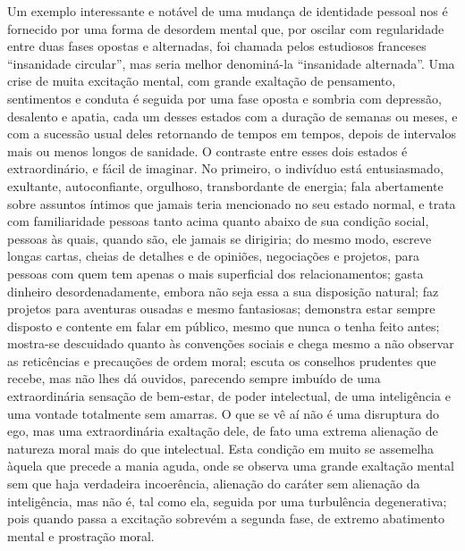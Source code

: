 Um exemplo interessante e notável de uma mudança de identidade pessoal
nos é fornecido por uma forma de desordem mental que, por oscilar com
regularidade entre duas fases opostas e alternadas, foi chamada pelos
estudiosos franceses “insanidade circular”, mas seria melhor
denominá-la “insanidade alternada”.  Uma crise de muita excitação
mental, com grande exaltação de pensamento, sentimentos e conduta é
seguida por uma fase oposta e sombria com depressão, desalento e
apatia, cada um desses estados com a duração de semanas ou meses, e com
a sucessão usual deles retornando de tempos em tempos, depois de
intervalos mais ou menos longos de sanidade.  O contraste entre esses
dois estados é extraordinário, e fácil de imaginar.  No primeiro, o
indivíduo está entusiasmado, exultante, autoconfiante, orgulhoso,
transbordante de energia; fala abertamente sobre assuntos íntimos que
jamais teria mencionado no seu estado normal, e trata com familiaridade
pessoas tanto acima quanto abaixo de sua condição social, pessoas às
quais, quando são, ele jamais se dirigiria; do mesmo modo, escreve
longas cartas, cheias de detalhes e de opiniões, negociações e
projetos, para pessoas com quem tem apenas o mais superficial dos
relacionamentos; gasta dinheiro desordenadamente, embora não seja essa
a sua disposição natural; faz projetos para aventuras ousadas e mesmo
fantasiosas; demonstra estar sempre disposto e contente em falar em
público, mesmo que nunca o tenha feito antes; mostra-se descuidado
quanto às convenções sociais e chega mesmo a não observar as
reticências e precauções de ordem moral; escuta os conselhos prudentes
que recebe, mas não lhes dá ouvidos, parecendo sempre imbuído de uma
extraordinária sensação de bem-estar, de poder intelectual, de uma
inteligência e uma vontade totalmente sem amarras.  O que se vê aí não
é uma disruptura do ego, mas uma extraordinária exaltação dele, de fato
uma extrema alienação de natureza moral mais do que intelectual.  Esta
condição em muito se assemelha àquela que precede a mania aguda, onde
se observa uma grande exaltação mental sem que haja verdadeira
incoerência, alienação do caráter sem alienação da inteligência, mas
não é, tal como ela, seguida por uma turbulência degenerativa; pois
quando passa a excitação sobrevém a segunda fase, de extremo abatimento
mental e prostração moral. 

